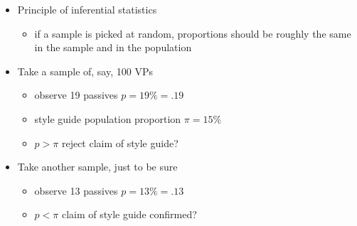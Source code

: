 \documentclass[a4paper,landscape,headrule,footrule,dvips]{foils}
\begin{document}
\begin{CJK}{UTF8}{min}
\begin{itemize}
\item Principle of inferential statistics
\begin{itemize}
\item if a sample is picked at random, proportions should be
roughly the same in the sample and in the population
\end{itemize}
\item Take a sample of, say, 100 VPs
\begin{itemize}
\item observe 19 passives \into $p = 19\% = .19$
\item style guide \into population proportion $\pi = 15\%$
\item $p > \pi$ \into reject claim of style guide?
\end{itemize}
\item Take another sample, just to be sure
\begin{itemize}
\item observe 13 passives \into $p = 13\% = .13$
\item $p < \pi$ \into claim of style guide confirmed?
\end{itemize}
\end{itemize}


\end{CJK}
\end{document}
